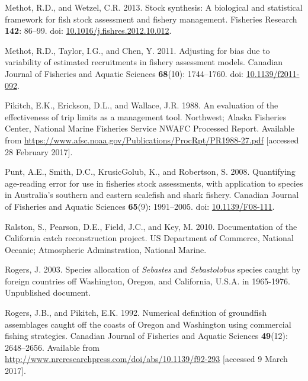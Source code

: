 \documentclass[12pt,]{article}
\begin{document}
\hypertarget{ref-methot_stock_2013}{}
Methot, R.D., and Wetzel, C.R. 2013. Stock synthesis: A biological and
statistical framework for fish stock assessment and fishery management.
Fisheries Research \textbf{142}: 86--99. doi:
\href{https://doi.org/10.1016/j.fishres.2012.10.012}{10.1016/j.fishres.2012.10.012}.

\hypertarget{ref-methot_adjusting_2011}{}
Methot, R.D., Taylor, I.G., and Chen, Y. 2011. Adjusting for bias due to
variability of estimated recruitments in fishery assessment models.
Canadian Journal of Fisheries and Aquatic Sciences \textbf{68}(10):
1744--1760. doi:
\href{https://doi.org/10.1139/f2011-092}{10.1139/f2011-092}.

\hypertarget{ref-pikitch_evaluation_1988}{}
Pikitch, E.K., Erickson, D.L., and Wallace, J.R. 1988. An evaluation of
the effectiveness of trip limits as a management tool. Northwest; Alaska
Fisheries Center, National Marine Fisheries Service NWAFC Processed
Report. Available from
\url{https://www.afsc.noaa.gov/Publications/ProcRpt/PR1988-27.pdf}
{[}accessed 28 February 2017{]}.

\hypertarget{ref-punt_quantifying_2008}{}
Punt, A.E., Smith, D.C., KrusicGolub, K., and Robertson, S. 2008.
Quantifying age-reading error for use in fisheries stock assessments,
with application to species in Australia's southern and eastern
scalefish and shark fishery. Canadian Journal of Fisheries and Aquatic
Sciences \textbf{65}(9): 1991--2005. doi:
\href{https://doi.org/10.1139/F08-111}{10.1139/F08-111}.

\hypertarget{ref-ralston_documentation_2010}{}
Ralston, S., Pearson, D.E., Field, J.C., and Key, M. 2010. Documentation
of the California catch reconstruction project. US Department of
Commerce, National Oceanic; Atmospheric Adminstration, National Marine.

\hypertarget{ref-rogers_species_2003}{}
Rogers, J. 2003. Species allocation of \emph{Sebastes} and
\emph{Sebastolobus} species caught by foreign countries off Washington,
Oregon, and California, U.S.A. in 1965-1976. Unpublished document.

\hypertarget{ref-rogers_numerical_1992}{}
Rogers, J.B., and Pikitch, E.K. 1992. Numerical definition of groundfish
assemblages caught off the coasts of Oregon and Washington using
commercial fishing strategies. Canadian Journal of Fisheries and Aquatic
Sciences \textbf{49}(12): 2648--2656. Available from
\url{http://www.nrcresearchpress.com/doi/abs/10.1139/f92-293}
{[}accessed 9 March 2017{]}.
\end{document}

